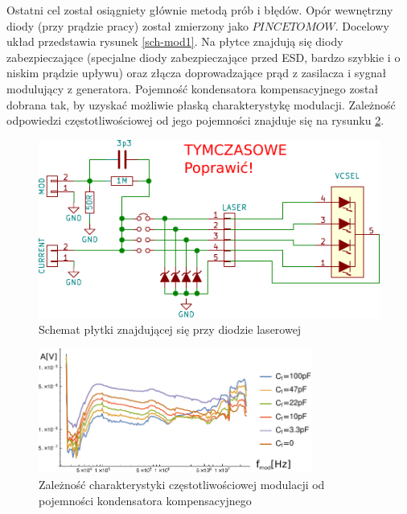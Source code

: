 \documentclass[a4paper,10pt]{article}
\begin{document}
Ostatni cel został osiągniety głównie metodą prób i błędów. Opór wewnętrzny diody (przy prądzie pracy) został zmierzony jako $PINCET OMOW$.
Docelowy układ przedstawia rysunek \ref{sch-mod1}. Na płytce znajdują się diody zabezpieczające (specjalne diody zabezpieczające przed ESD, bardzo szybkie i o niskim prądzie upływu) oraz złącza doprowadzające prąd z zasilacza i sygnał modulujący z generatora. Pojemność kondensatora kompensacyjnego został dobrana tak, by uzyskać możliwie płaską charakterystykę modulacji. Zależność odpowiedzi częstotliwościowej od jego pojemności znajduje się na rysunku \ref{wyk-mod}.

\begin{figure}
\begin{center}
 \includegraphics{./obrazki/dings.pdf}
\end{center}
\caption{Schemat płytki znajdującej się przy diodzie laserowej}
\label{sch-mod}
\end{figure}

\begin{figure}
\begin{center}
 \includegraphics[width=0.8\textwidth]{./obrazki/bw.pdf}
\end{center}
\caption{Zależność charakterystyki częstotliwościowej modulacji od pojemności kondensatora kompensacyjnego}
\label{wyk-mod}
\end{figure}
\end{document}
